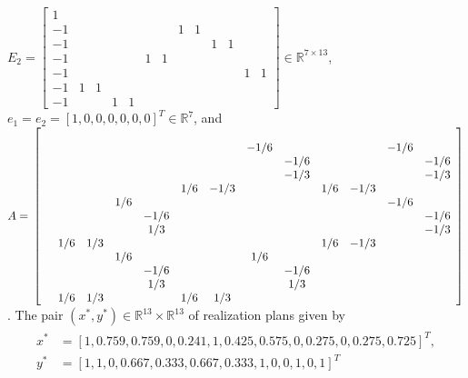 \documentclass[12pt]{article}
\begin{document}
$E_2 = \left[\begin{array}{ccccccccccccc}
1 &   &   &   &   &   &   &   &   &   &   &   &  \\
-1 &   &   &   &   &   &   & 1 & 1 &   &   &   &  \\
-1 &   &   &   &   &   &   &   &   & 1 & 1 &   &  \\
-1 &   &   &   &   & 1 & 1 &   &   &   &   &   &  \\
-1 &   &   &   &   &   &   &   &   &   &   & 1 & 1\\
-1 & 1 & 1 &   &   &   &   &   &   &   &   &   &  \\
-1 &   &   & 1 & 1 &   &   &   &   &   &   &   &  
\end{array}\right] \in \mathbb{R}^{7 \times 13}$, \\ $e_1 = e_2 = [1, 0, 0, 0, 0, 0, 0]^T \in \mathbb{R}^7$, and $A = \\\left[\begin{array}{ccccccccccccc}
  &   &   &   &   &   &   &   &   &   &   &   &  \\
  &   &   &   &   &   &   & -1 / 6 &   &   &   & -1 / 6 &  \\
  &   &   &   &   &   &   &   & -1 / 6 &   &   &   & -1 / 6\\
  &   &   &   &   &   &   &   & -1 / 3 &   &   &   & -1 / 3\\
  &   &   &   &   & 1 / 6 & -1 / 3 &   &   & 1 / 6 & -1 / 3 &   &  \\
  &   &   & 1 / 6 &   &   &   &   &   &   &   & -1 / 6 &  \\
  &   &   &   & -1 / 6 &   &   &   &   &   &   &   & -1 / 6\\
  &   &   &   & 1 / 3 &   &   &   &   &   &   &   & -1 / 3\\
  & 1 / 6 & 1 / 3 &   &   &   &   &   &   & 1 / 6 & -1 / 3 &   &  \\
  &   &   & 1 / 6 &   &   &   & 1 / 6 &   &   &   &   &  \\
  &   &   &   & -1 / 6 &   &   &   & -1 / 6 &   &   &   &  \\
  &   &   &   & 1 / 3 &   &   &   & 1 / 3 &   &   &   &  \\
  & 1 / 6 & 1 / 3 &   &   & 1 / 6 & 1 / 3 &   &   &   &   &   &  
\end{array}\right]$.
The pair $(x^*, y^*) \in \mathbb{R}^{13} \times \mathbb{R}^{13}$ of realization plans given by
\begin{eqnarray*}
  \begin{split}
    x^* &= [1, 0.759, 0.759, 0, 0.241, 1, 0.425, 0.575, 0, 0.275, 0, 0.275, 0.725]^T,\\
    y^* &= [1, 1, 0, 0.667, 0.333, 0.667, 0.333, 1, 0, 0, 1, 0, 1]^T
    \end{split}
\end{eqnarray*}
\end{document}
